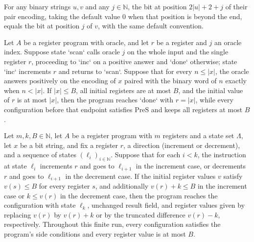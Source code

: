 \begin{theorem}
\label{Complexity.pairEncode_getD_snd}
\leanok
{}
For any binary strings $u,v$ and any $j\in\mathbb{N}$, the bit at position $2|u|+2+j$ of
their pair encoding, taking the default value $0$ when that position is beyond the end,
equals the bit at position $j$ of $v$, with the same default convention.
\end{theorem}

\begin{theorem}
\label{Complexity.LogProg.inputLength_loop}
\leanok
{}
Let $A$ be a register program with oracle, and let $r$ be a register and $j$ an oracle
index. Suppose state `scan` calls oracle $j$ on the whole input and the single register
$r$, proceeding to `inc` on a positive answer and `done` otherwise; state `inc`
increments $r$ and returns to `scan`. Suppose that for every $n\le |x|$, the oracle
answers positively on the encoding of $x$ paired with the binary word of $n$ exactly
when $n<|x|$. If $|x|\le B$, all initial registers are at most $B$, and the initial
value of $r$ is at most $|x|$, then the program reaches `done` with $r=|x|$, while every
configuration before that endpoint satisfies $\mathrm{PreS}$ and keeps all registers at
most $B$.
\end{theorem}

\begin{theorem}
\label{Complexity.LogProg.arm_chain}
\leanok
{}
Let $m,k,B\in\mathbb{N}$, let $A$ be a register program with $m$ registers and a state
set $\Lambda$, let $x$ be a bit string, and fix a register $r$, a direction (increment
or decrement), and a sequence of states $(\ell_i)_{i\in\mathbb{N}}$. Suppose that for
each $i<k$, the instruction at state $\ell_i$ increments $r$ and goes to $\ell_{i+1}$ in
the increment case, or decrements $r$ and goes to $\ell_{i+1}$ in the decrement case. If
the initial register values $v$ satisfy $v(s)\le B$ for every register $s$, and
additionally $v(r)+k\le B$ in the increment case or $k\le v(r)$ in the decrement case,
then the program reaches the configuration with state $\ell_k$, unchanged result field,
and register values given by replacing $v(r)$ by $v(r)+k$ or by the truncated difference
$v(r)-k$, respectively. Throughout this finite run, every configuration satisfies the
program's side conditions and every register value is at most $B$.
\end{theorem}

